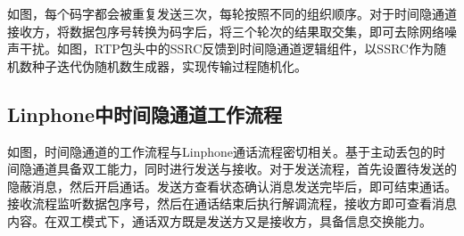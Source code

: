 
如图，每个码字都会被重复发送三次，每轮按照不同的组织顺序。对于时间隐通道接收方，将数据包序号转换为码字后，将三个轮次的结果取交集，即可去除网络噪声干扰。如图，RTP包头中的SSRC反馈到时间隐通道逻辑组件，以SSRC作为随机数种子迭代伪随机数生成器，实现传输过程随机化。

\subsection{Linphone中时间隐通道工作流程}
\label{chap:linphone:designation:workflow}


如图，时间隐通道的工作流程与Linphone通话流程密切相关。基于主动丢包的时间隐通道具备双工能力，同时进行发送与接收。对于发送流程，首先设置待发送的隐蔽消息，然后开启通话。发送方查看状态确认消息发送完毕后，即可结束通话。接收流程监听数据包序号，然后在通话结束后执行解调流程，接收方即可查看消息内容。在双工模式下，通话双方既是发送方又是接收方，具备信息交换能力。